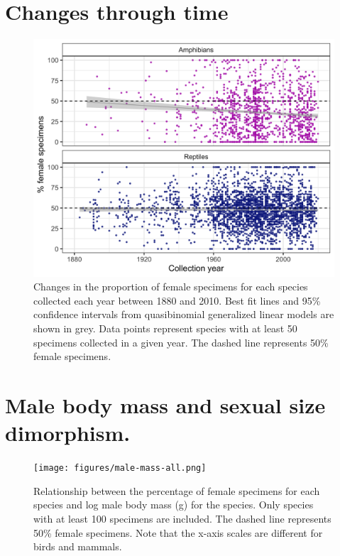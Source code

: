 \documentclass[a4paper, 12pt]{article}
\begin{document}
\section{Changes through time}

\begin{figure}[H]
 \centering
  \includegraphics[scale = 0.4]{figures/years-all.png}
  \caption{Changes in the proportion of female specimens for each species collected each year between 1880 and 2010. 
  Best fit lines and 95\% confidence intervals from quasibinomial generalized linear models are shown in grey. 
  Data points represent species with at least 50 specimens collected in a given year. 
  The dashed line represents 50\% female specimens.
}
  \label{fig-time}
\end{figure} 

\newpage
\section{Male body mass and sexual size dimorphism.}

\begin{figure}[H]
 \centering
  \texttt{[image: figures/male-mass-all.png]}
  \caption{Relationship between the percentage of female specimens for each species and log male body mass (g) for the species. 
  Only species with at least 100 specimens are included. 
  The dashed line represents 50\% female specimens. 
  Note that the x-axis scales are different for birds and mammals.
}
  \label{fig-male-mass}
\end{figure}
\end{document}
